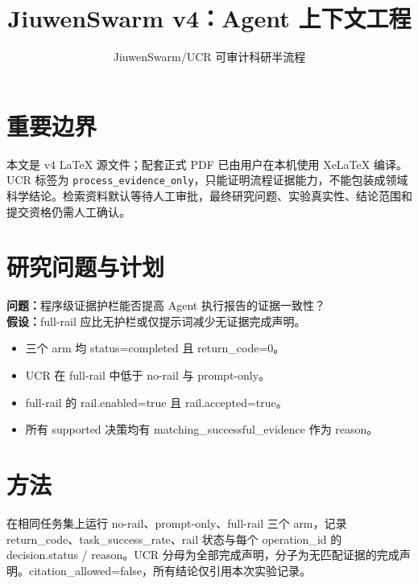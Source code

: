 \documentclass[UTF8]{ctexart}
\title{JiuwenSwarm v4：Agent 上下文工程}
\author{JiuwenSwarm/UCR 可审计科研半流程}
\date{}
\begin{document}
\maketitle
\section{重要边界}
本文是 v4 LaTeX 源文件；配套正式 PDF 已由用户在本机使用 XeLaTeX 编译。UCR 标签为 \texttt{process\_evidence\_only}，只能证明流程证据能力，不能包装成领域科学结论。检索资料默认等待人工审批，最终研究问题、实验真实性、结论范围和提交资格仍需人工确认。
\section{研究问题与计划}
\textbf{问题：}程序级证据护栏能否提高 Agent 执行报告的证据一致性？\\
\textbf{假设：}full-\allowbreak{}rail 应比无护栏或仅提示词减少无证据完成声明。
\begin{itemize}
\item 三个 arm 均 status=completed 且 return\_\allowbreak{}code=0。
\item UCR 在 full-\allowbreak{}rail 中低于 no-\allowbreak{}rail 与 prompt-\allowbreak{}only。
\item full-\allowbreak{}rail 的 rail.enabled=true 且 rail.accepted=true。
\item 所有 supported 决策均有 matching\_\allowbreak{}successful\_\allowbreak{}evidence 作为 reason。
\end{itemize}
\section{方法}
在相同任务集上运行 no-\allowbreak{}rail、prompt-\allowbreak{}only、full-\allowbreak{}rail 三个 arm，记录 return\_\allowbreak{}code、task\_\allowbreak{}success\_\allowbreak{}rate、rail 状态与每个 operation\_\allowbreak{}id 的 decision.status / reason。UCR 分母为全部完成声明，分子为无匹配证据的完成声明。citation\_\allowbreak{}allowed=false，所有结论仅引用本次实验记录。
\end{document}
